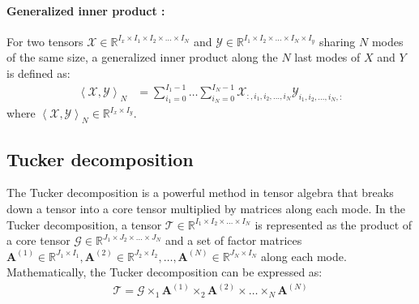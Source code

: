 \documentclass{article}
\begin{document}
\paragraph{Generalized inner product : }
For two tensors $\mathcal{X} \in \mathbb{R}^{I_x \times I_1 \times I_2 \times \dots \times I_N}$ and $\mathcal{Y} \in \mathbb{R}^{I_1 \times I_2 \times \dots \times I_N \times I_y}$ sharing $N$ modes of the same size, a generalized inner product \cite{r4} along the $N$ last modes of $X$ and $Y$ is defined as:
\begin{align}
	\left\langle\mathcal{X}, \mathcal{Y}\right\rangle_N &= \sum_{i_1=0}^{I_1-1} \dots \sum_{i_N=0}^{I_N-1} \mathcal{X}_{:, i_1, i_2, \ldots, i_N} \mathcal{Y}_{i_1, i_2, \ldots, i_N, :}
\end{align}
where $\left\langle\mathcal{X}, \mathcal{Y}\right\rangle_N \in \mathbb{R}^{I_x\times I_y} $.
\subsection{Tucker decomposition}
\label{subsec:tucker-decomposition}
The Tucker decomposition \cite{r4} is a powerful method in tensor algebra that breaks down a tensor into a core tensor multiplied by matrices along each mode. In the Tucker decomposition, a tensor $\mathcal{T} \in \mathbb{R}^{I_1 \times I_2 \times \dots \times I_N}$ is represented as the product of a core tensor $\mathcal{G} \in \mathbb{R}^{J_1 \times J_2 \times \dots \times J_N}$ and a set of factor matrices $\mathbf{A}^{(1)} \in \mathbb{R}^{J_1 \times I_1}, \mathbf{A}^{(2)} \in \mathbb{R}^{J_2 \times I_2}, \dots, \mathbf{A}^{(N)} \in \mathbb{R}^{J_N \times I_N}$ along each mode. Mathematically, the Tucker decomposition can be expressed as:
\begin{align}
	\label{eq:tucker-decomposition}
	\mathcal{T} = \mathcal{G} \times_1 \mathbf{A}^{(1)} \times_2 \mathbf{A}^{(2)} \times \dots \times_N \mathbf{A}^{(N)}
\end{align}
\end{document}
